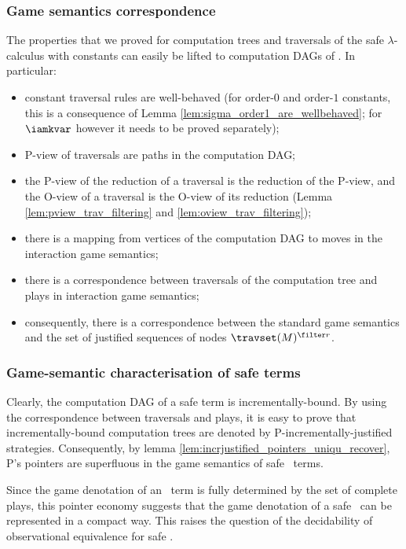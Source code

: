 \subsubsection{Game semantics correspondence}
The properties that we proved for computation trees and traversals
of the safe $\lambda$-calculus with constants can easily be lifted
to computation DAGs of \ialgol. In particular:
\begin{itemize}
\item constant traversal rules are well-behaved (for order-$0$ and order-$1$ constants, this is a consequence
of Lemma \ref{lem:sigma_order1_are_wellbehaved}; for $\iamkvar$
however it needs to be proved separately);
\item P-view of traversals are paths in the computation DAG;
\item the P-view of the reduction of a traversal is the reduction of the P-view,
and the O-view of a traversal is the O-view of its reduction
(Lemma \ref{lem:pview_trav_filtering} and \ref{lem:oview_trav_filtering});
\item there is a mapping from vertices of the computation DAG to moves in the interaction game semantics;
\item there is a correspondence between traversals of the computation tree and plays in interaction game semantics;
\item consequently, there is a correspondence between the standard game semantics and
the set of justified sequences of nodes $\travset(M)^{\filter r}$.
\end{itemize}

\subsubsection{Game-semantic characterisation of safe terms}
Clearly, the computation DAG of a safe term is incrementally-bound.
By using the correspondence between traversals and plays, it is easy
to prove that incrementally-bound computation trees are denoted by
P-incrementally-justified strategies. Consequently, by lemma
\ref{lem:incrjustified_pointers_uniqu_recover}, P's pointers are superfluous in the
game semantics of safe \ialgol\ terms.

Since the game denotation of an \ialgol\ term is fully determined by
the set of complete plays, this pointer economy suggests that the
game denotation of a safe \ialgol\ can be represented in a compact
way. This raises the question of the decidability of observational
equivalence for safe \ialgol.
